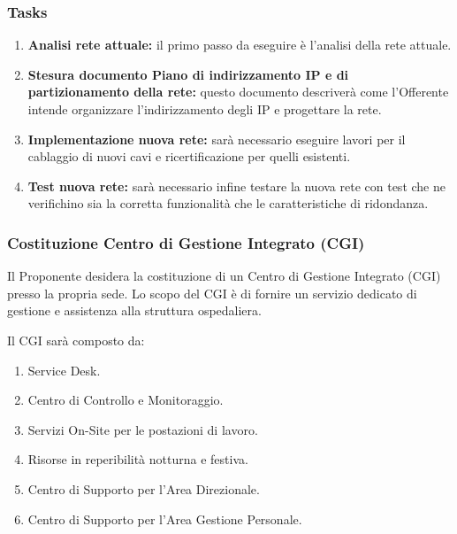                     \subsubsection*{Tasks}
                	\begin{enumerate}
                		\item \textbf{Analisi rete attuale:} il primo passo da eseguire è l'analisi della rete attuale.
                        \item \textbf{Stesura documento Piano di indirizzamento IP e di partizionamento della rete:} questo documento descriverà come l'Offerente intende organizzare l'indirizzamento degli IP e progettare la rete.
                        \item \textbf{Implementazione nuova rete:} sarà necessario eseguire lavori per il cablaggio di nuovi cavi e ricertificazione per quelli esistenti.
                        \item \textbf{Test nuova rete:} sarà necessario infine testare la nuova rete con test che ne verifichino sia la corretta funzionalità che le caratteristiche di ridondanza.
                	\end{enumerate}
                    
                    \subsubsection{Costituzione Centro di Gestione Integrato (CGI)}
                    	Il Proponente desidera la costituzione di un Centro di Gestione Integrato (CGI) presso la propria sede. Lo scopo del CGI è di fornire un servizio dedicato di gestione e assistenza alla struttura ospedaliera.
                        
                        
                        Il CGI sarà composto da:
                        \begin{enumerate}
                        	\item Service Desk.
                            \item Centro di Controllo e Monitoraggio.
                            \item Servizi On-Site per le postazioni di lavoro.
                            \item Risorse in reperibilità notturna e festiva.
                            \item Centro di Supporto per l'Area Direzionale.
                            \item Centro di Supporto per l'Area Gestione Personale.
                        \end{enumerate}
                        
